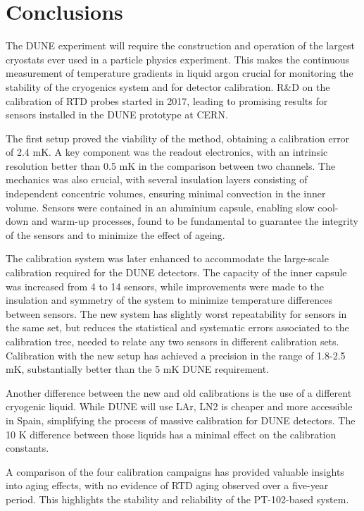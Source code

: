 \section{Conclusions}
\label{conclusions}

\noindent The DUNE experiment will require the construction and operation of the largest cryostats ever used in a particle physics experiment. This makes the continuous measurement of temperature gradients in liquid argon crucial for monitoring the stability of the cryogenics system and for detector calibration. R\&D on the calibration of RTD probes started in 2017, leading to promising results for sensors installed in the DUNE prototype at CERN. 

The first setup proved the viability of the method, obtaining a calibration error of 2.4 mK. A key component was the readout electronics, with an intrinsic resolution better than 0.5 mK in the comparison between two channels. The mechanics was also crucial, with several insulation layers consisting of independent concentric volumes, ensuring minimal convection in the inner volume. Sensors were contained in an aluminium capsule, enabling slow cool-down and warm-up processes, found to be fundamental to guarantee the integrity of the sensors and to minimize the effect of ageing. 

The calibration system was later enhanced to accommodate the large-scale calibration required for the DUNE detectors. The capacity of the inner capsule was increased from 4 to 14 sensors, while improvements were made to the insulation and symmetry of the system to minimize temperature differences between sensors. The new system has slightly worst repeatability for sensors in the same set, but reduces the statistical and systematic errors associated to the calibration tree, needed to relate any two sensors in different calibration sets. Calibration with the new setup has achieved a precision in the range of 1.8-2.5 mK, substantially better than the 5 mK DUNE requirement.  

Another difference between the new and old calibrations is the use of a different cryogenic liquid. While DUNE will use LAr, LN2 is cheaper and more accessible in Spain, simplifying the process of massive calibration for DUNE detectors. The 10 K difference between those liquids has a minimal effect on the calibration constants. 

A comparison of the four calibration campaigns has provided valuable insights into aging effects, with no evidence of RTD aging observed over a five-year period. This highlights the stability and reliability of the PT-102-based system.